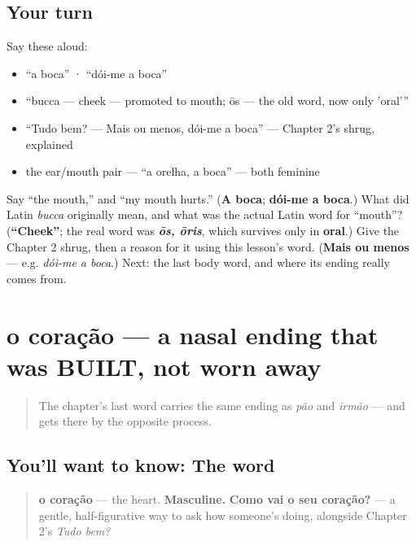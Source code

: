 \subsection*{Your turn}
Say these aloud:

\begin{itemize}
\raggedright
  \item \textquotedblleft{}a boca\textquotedblright{} · \textquotedblleft{}dói-me a boca\textquotedblright{}
  \item \textquotedblleft{}bucca — cheek — promoted to mouth; ōs — the old word, now only 'oral'\textquotedblright{}
  \item \textquotedblleft{}Tudo bem? — Mais ou menos, dói-me a boca\textquotedblright{} — Chapter 2's shrug, explained
  \item the ear/mouth pair — \textquotedblleft{}a orelha, a boca\textquotedblright{} — both feminine
\end{itemize}

\begin{tcolorbox}[breakable,colback=teal!4,colframe=teal!35!black,title={Before you move on}]
Say \textquotedblleft{}the mouth,\textquotedblright{} and \textquotedblleft{}my mouth hurts.\textquotedblright{} (\textbf{A boca}; \textbf{dói-me a boca}.) What did Latin \emph{bucca} originally mean, and what was the actual Latin word for \textquotedblleft{}mouth\textquotedblright{}? (\textbf{\textquotedblleft{}Cheek\textquotedblright{}}; the real word was \emph{\textbf{ōs, ōris}}, which survives only in \textbf{oral}.) Give the Chapter 2 shrug, then a reason for it using this lesson's word. (\textbf{Mais ou menos} — e.g. \emph{dói-me a boca}.) Next: the last body word, and where its ending really comes from.
\end{tcolorbox}
\section[o coração]{o coração — a nasal ending that was BUILT, not worn away}

\label{lesson:PT-C26-coracao}



\begin{quote}
The chapter's last word carries the same ending as \emph{pão} and \emph{irmão} — and gets there by the opposite process.
\end{quote}

\subsection*{You'll want to know: The word}
\begin{quote}
\textbf{o coração} — the heart. \textbf{Masculine.} \textbf{Como vai o seu coração?} — a gentle, half-figurative way to ask how someone's doing, alongside Chapter 2's \emph{Tudo bem?}
\end{quote}

